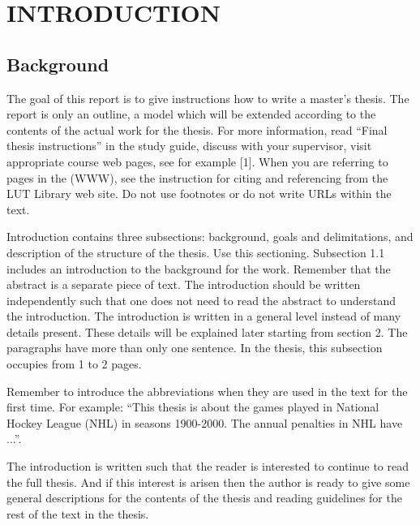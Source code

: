 \section{INTRODUCTION}\label{sec:intro}

\subsection[BACKGROUND]{Background}
\par The goal of this report is to give instructions how to write a master's thesis. The report is only an outline, a model which will be extended according to the contents of the actual work for the thesis. For more information, read ``Final thesis instructions'' in the study guide, discuss with your supervisor, visit appropriate course web pages, see for example [1].  When you are referring to pages in the (WWW), see the instruction for citing and referencing from the LUT Library web site. Do not use footnotes or do not write URLs within the text. 

\par Introduction contains three subsections: background, goals and delimitations, and description of the structure of the thesis. Use this sectioning.  Subsection 1.1 includes an introduction to the background for the work.  Remember that the abstract is a separate piece of text. The introduction should be written independently such that one does not need to read the abstract to understand the introduction.  The introduction is written in a general level instead of many details present. These details will be explained later starting from section 2. The paragraphs have more than only one sentence. In the thesis, this subsection occupies from 1 to 2 pages.

\par Remember to introduce the abbreviations when they are used in the text for the first time. For example: ``This thesis is about the games played in National Hockey League (NHL) in seasons 1900-2000. The annual penalties in NHL have ...''.

\par The introduction is written such that the reader is interested to continue to read the full thesis. And if this interest is arisen then the author is ready to give some general descriptions for the contents of the thesis and reading guidelines for the rest of the text in the thesis.

